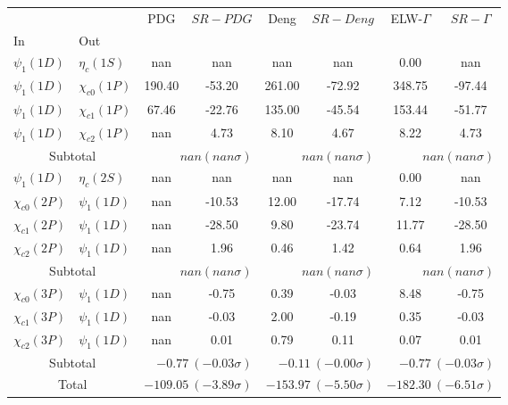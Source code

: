 \begin{tabular}{|l|l|c|c|c|c|c|c|}%
\hline%
&&PDG&$SR-PDG$&Deng&$SR-Deng$&ELW-$\Gamma$&$SR-\Gamma$\\%
In&Out&&&&&&\\%
\hline%
$\psi_{1}(1D)$&$\eta_{c}(1S)$&nan&nan&nan&nan&0.00&nan\\%
$\psi_{1}(1D)$&$\chi_{c0}(1P)$&190.40&-53.20&261.00&-72.92&348.75&-97.44\\%
$\psi_{1}(1D)$&$\chi_{c1}(1P)$&67.46&-22.76&135.00&-45.54&153.44&-51.77\\%
$\psi_{1}(1D)$&$\chi_{c2}(1P)$&nan&4.73&8.10&4.67&8.22&4.73\\%
\hline%
\hline%
\multicolumn{2}{|c|}{Subtotal}&\multicolumn{2}{|r|}{$nan (nan\sigma)$}&\multicolumn{2}{|r|}{$nan (nan\sigma)$}&\multicolumn{2}{|r|}{$nan (nan\sigma)$}\\%
\hline%
\hline%
$\psi_{1}(1D)$&$\eta_{c}(2S)$&nan&nan&nan&nan&0.00&nan\\%
$\chi_{c0}(2P)$&$\psi_{1}(1D)$&nan&-10.53&12.00&-17.74&7.12&-10.53\\%
$\chi_{c1}(2P)$&$\psi_{1}(1D)$&nan&-28.50&9.80&-23.74&11.77&-28.50\\%
$\chi_{c2}(2P)$&$\psi_{1}(1D)$&nan&1.96&0.46&1.42&0.64&1.96\\%
\hline%
\hline%
\multicolumn{2}{|c|}{Subtotal}&\multicolumn{2}{|r|}{$nan (nan\sigma)$}&\multicolumn{2}{|r|}{$nan (nan\sigma)$}&\multicolumn{2}{|r|}{$nan (nan\sigma)$}\\%
\hline%
\hline%
$\chi_{c0}(3P)$&$\psi_{1}(1D)$&nan&-0.75&0.39&-0.03&8.48&-0.75\\%
$\chi_{c1}(3P)$&$\psi_{1}(1D)$&nan&-0.03&2.00&-0.19&0.35&-0.03\\%
$\chi_{c2}(3P)$&$\psi_{1}(1D)$&nan&0.01&0.79&0.11&0.07&0.01\\%
\hline%
\hline%
\multicolumn{2}{|c|}{Subtotal}&\multicolumn{2}{|r|}{$-0.77~(-0.03\sigma)$}&\multicolumn{2}{|r|}{$-0.11~(-0.00\sigma)$}&\multicolumn{2}{|r|}{$-0.77~(-0.03\sigma)$}\\%
\hline%
\hline%
\multicolumn{2}{|c|}{Total}&\multicolumn{2}{|r|}{$-109.05~(-3.89\sigma)$}&\multicolumn{2}{|r|}{$-153.97~(-5.50\sigma)$}&\multicolumn{2}{|r|}{$-182.30~(-6.51\sigma)$}\\%
\hline%
\end{tabular}